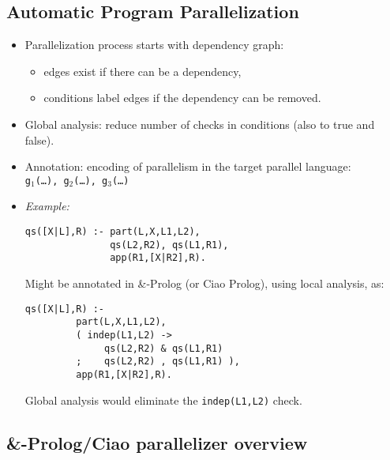 \documentclass{article}
\renewcommand{\_}{\char'137}
\begin{document}
\subsection{Automatic Program Parallelization}

\begin{itemize}
\item Parallelization process \cite{effofai-toplas} starts with
  dependency graph:  
\begin{itemize}
\item edges exist if there can be a dependency,
\item conditions label edges if the dependency can be removed.
\end{itemize}

\item Global analysis:
reduce number of checks in conditions (also to true and false).

\item Annotation: encoding of parallelism in the target parallel
  language:\\[3mm] 
      {\tt g$_1$(\ldots), g$_2$(\ldots), g$_3$(\ldots)}\\


\item {\em Example:}
\begin{verbatim}
qs([X|L],R) :- part(L,X,L1,L2), 
               qs(L2,R2), qs(L1,R1), 
               app(R1,[X|R2],R).
\end{verbatim}
Might be annotated in \&-Prolog (or Ciao Prolog), using local analysis, as:
\begin{verbatim}
qs([X|L],R) :- 
         part(L,X,L1,L2), 
         ( indep(L1,L2) -> 
              qs(L2,R2) & qs(L1,R1)
         ;    qs(L2,R2) , qs(L1,R1) ), 
         app(R1,[X|R2],R). 
\end{verbatim}
Global analysis would eliminate the \texttt{indep(L1,L2)} check.
\end{itemize}

\subsection{\&-Prolog/Ciao parallelizer overview}
\end{document}
